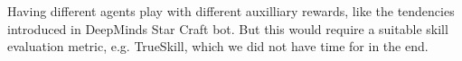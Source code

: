 

Having different agents play with different auxilliary rewards, like the tendencies introduced in DeepMinds Star Craft bot. But this would require a suitable skill evaluation metric, e.g. TrueSkill, which we did not have time for in the end.
